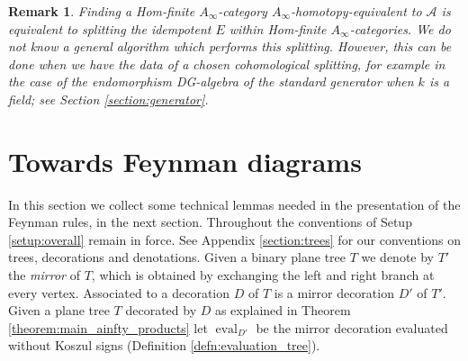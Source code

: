 \documentclass[english,letter paper,12pt,leqno]{article}
\theoremstyle{example}
\newtheorem{remark}[theorem]{Remark}
\numberwithin{equation}{section}
\def\AA{\mathcal{A}}
\begin{document}
\begin{remark} Finding a Hom-finite $A_\infty$-category $A_\infty$-homotopy-equivalent to $\AA$ is equivalent to \emph{splitting} the idempotent $E$ within Hom-finite $A_\infty$-categories. We do not know a general algorithm which performs this splitting. However, this can be done when we have the data of a chosen cohomological splitting, for example in the case of the endomorphism DG-algebra of the standard generator when $k$ is a field; see Section \ref{section:generator}.
\end{remark}

\section{Towards Feynman diagrams}\label{section:towards}

In this section we collect some technical lemmas needed in the presentation of the Feynman rules, in the next section. Throughout the conventions of Setup \ref{setup:overall} remain in force. See Appendix \ref{section:trees} for our conventions on trees, decorations and denotations. Given a binary plane tree $T$ we denote by $T'$ the \emph{mirror} of $T$, which is obtained by exchanging the left and right branch at every vertex. Associated to a decoration $D$ of $T$ is a mirror decoration $D'$ of $T'$. Given a plane tree $T$ decorated by $D$ as explained in Theorem \ref{theorem:main_ainfty_products} let $\operatorname{eval}_{D'}$ be the mirror decoration evaluated without Koszul signs (Definition \ref{defn:evaluation_tree}).

\end{document}
